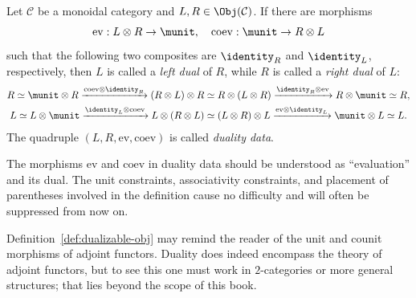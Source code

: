 \begin{definition}\label{def:dualizable-obj}
	Let $\mathcal{C}$ be a monoidal category and
	$L,R\in\Obj(\mathcal{C})$. If there are morphisms
	\[ \mathrm{ev}: L \otimes R \to \munit, \quad \mathrm{coev}: \munit \to R \otimes L \]
	such that the following two composites are $\identity_R$ and
	$\identity_L$, respectively, then $L$ is called a \emph{left dual} of
	$R$, while $R$ is called a \emph{right dual} of $L$:
	\begin{gather*}
		R \simeq \munit \otimes R \xrightarrow{\mathrm{coev} \otimes \identity_R} (R \otimes L) \otimes R \simeq  R \otimes (L \otimes R) \xrightarrow{\identity_R \otimes \mathrm{ev}} R \otimes \munit \simeq R, \\
		L \simeq L \otimes \munit \xrightarrow{\identity_L \otimes \mathrm{coev}} L \otimes (R \otimes L) \simeq (L \otimes R) \otimes L \xrightarrow{\mathrm{ev} \otimes \identity_L} \munit \otimes L \simeq L.
	\end{gather*}
	The quadruple $(L,R,\mathrm{ev},\mathrm{coev})$ is called
	\emph{duality data}.
\end{definition}

The morphisms $\mathrm{ev}$ and $\mathrm{coev}$ in duality data should be
understood as ``evaluation'' and its dual. The unit constraints,
associativity constraints, and placement of parentheses involved in the
definition cause no difficulty and will often be suppressed from now on.

Definition~\ref{def:dualizable-obj} may remind the reader of the unit and
counit morphisms of adjoint functors. Duality does indeed encompass the
theory of adjoint functors, but to see this one must work in $2$-categories
or more general structures; that lies beyond the scope of this book.

